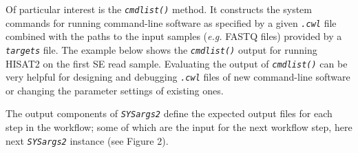 \documentclass[14pt,]{article}
\newcommand{\hlnum}[1]{\textcolor[rgb]{0.816,0.125,0.439}{#1}}%
\newcommand{\hlcom}[1]{\textcolor[rgb]{0.502,0.502,0.502}{\textit{#1}}}%
\newcommand{\hlstd}[1]{\textcolor[rgb]{0.251,0.251,0.251}{#1}}%
\newcommand{\hlkwd}[1]{\textcolor[rgb]{0.878,0.439,0.125}{#1}}%
\newenvironment{Shaded}{\begin{myshaded}}{\end{myshaded}}
\newcommand{\KeywordTok}[1]{\hlkwd{#1}}
\newcommand{\DecValTok}[1]{\hlnum{#1}}
\newcommand{\CommentTok}[1]{\hlcom{#1}}
\newcommand{\NormalTok}[1]{\hlstd{#1}}
\begin{document}
Of particular interest is the \emph{\texttt{cmdlist()}} method. It constructs the system
commands for running command-line software as specified by a given \emph{\texttt{.cwl}}
file combined with the paths to the input samples (\emph{e.g.} FASTQ files) provided
by a \emph{\texttt{targets}} file. The example below shows the \emph{\texttt{cmdlist()}} output for
running HISAT2 on the first SE read sample. Evaluating the output of
\emph{\texttt{cmdlist()}} can be very helpful for designing and debugging \emph{\texttt{.cwl}} files
of new command-line software or changing the parameter settings of existing
ones.

\begin{Shaded}
\end{Shaded}

The output components of \emph{\texttt{SYSargs2}} define the expected output files for
each step in the workflow; some of which are the input for the next workflow step,
here next \emph{\texttt{SYSargs2}} instance (see Figure 2).
\end{document}

